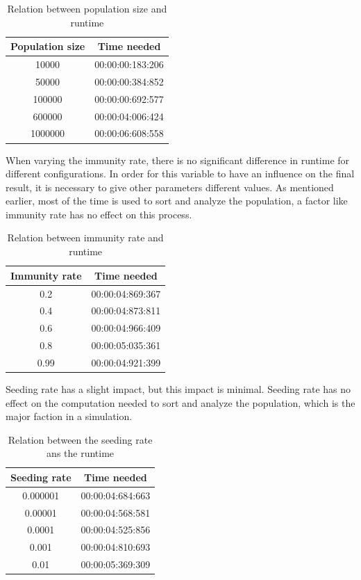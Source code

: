 \documentclass[runningheads]{llncs}
\begin{document}
\begin{table}
	\caption{Relation between population size and runtime}
\begin{center}
	\begin{tabular}{ | c | c |}
		\hline
		Population size & Time needed \\ \hline
		10000 & 00:00:00:183:206 \\ \hline
		50000 & 00:00:00:384:852 \\ \hline
		100000 & 00:00:00:692:577 \\ \hline
		600000 & 00:00:04:006:424 \\ \hline
		1000000 & 00:00:06:608:558 \\
		\hline	
	\end{tabular}
\end{center} 
\end{table}
\newpage
\noindent
When varying the immunity rate, there is no significant difference in runtime for different configurations. In order for this variable to have an influence on the final result, it is necessary to give other parameters different values.  As mentioned earlier, most of the time is used to sort and analyze the population, a factor like immunity rate has no effect on this process.

\begin{table}
	\caption{Relation between immunity rate and runtime}
\begin{center}
	\begin{tabular}{ | c | c |}
		\hline
		Immunity rate & Time needed \\ \hline
		0.2 & 00:00:04:869:367 \\ \hline
		0.4 & 00:00:04:873:811 \\ \hline
		0.6 & 00:00:04:966:409 \\ \hline
		0.8 & 00:00:05:035:361 \\ \hline
		0.99 & 00:00:04:921:399 \\
		\hline	
	\end{tabular}
\end{center}
\end{table}
 
\noindent
Seeding rate has a slight impact, but this impact is minimal. Seeding rate has no effect on the computation needed to sort and analyze the population, which is the major faction in a simulation.
\begin{table}
\caption{Relation between the seeding rate ans the runtime}
\begin{center}
	\begin{tabular}{ | c | c |}
		\hline
		Seeding rate & Time needed \\ \hline
		0.000001 & 00:00:04:684:663 \\ \hline
		0.00001 & 00:00:04:568:581 \\ \hline
		0.0001 & 00:00:04:525:856 \\ \hline
		0.001 & 00:00:04:810:693 \\ \hline
		0.01 & 00:00:05:369:309 \\
		\hline	
	\end{tabular}
\end{center} 
\end{table} 
\noindent
\end{document}
